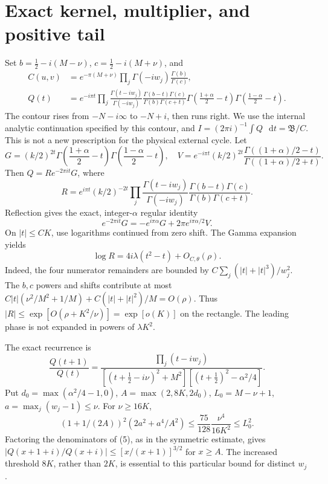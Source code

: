 \documentclass[11pt,a4paper]{article}
\newcommand{\dd}{\mathop{}\!\mathrm d}
\begin{document}
\newpage
\section{Exact kernel, multiplier, and positive tail}
Set \(b=\tfrac12-i(M-\nu)\), \(c=\tfrac12-i(M+\nu)\), and
\begin{align*}
 C(u,v)&=e^{-\pi(M+\nu)}\prod_j\Gamma(-iw_j)\frac{\Gamma(b)}{\Gamma(c)},\\
 Q(t)&=e^{-i\pi t}\prod_j\frac{\Gamma(t-iw_j)}{\Gamma(-iw_j)}
 \frac{\Gamma(b-t)\Gamma(c)}{\Gamma(b)\Gamma(c+t)}
 \Gamma\left(\frac{1+\alpha}2-t\right)
 \Gamma\left(\frac{1-\alpha}2-t\right).
\end{align*}
The contour rises from \(-N-i\infty\) to \(-N+i\), then runs right.
We use the internal analytic continuation specified by this contour,
and \(I=(2\pi i)^{-1}\int Q\,\dd t=\mathfrak B/C\).
This is not a new prescription for the physical external cycle.
Let
\[
 G=(k/2)^{2t}\Gamma\left(\frac{1+\alpha}2-t\right)
                 \Gamma\left(\frac{1-\alpha}2-t\right),\quad
 V=e^{-i\pi t}(k/2)^{2t}
       \frac{\Gamma((1+\alpha)/2-t)}{\Gamma((1+\alpha)/2+t)} .
\]
Then \(Q=Re^{-2\pi it}G\), where
\[
 R=e^{i\pi t}(k/2)^{-2t}\prod_j\frac{\Gamma(t-iw_j)}{\Gamma(-iw_j)}
        \frac{\Gamma(b-t)\Gamma(c)}{\Gamma(b)\Gamma(c+t)} .
\]
Reflection gives the exact, integer-\(\alpha\) regular identity
\[
 e^{-2\pi it}G=-e^{i\pi\alpha}G+2\pi e^{i\pi\alpha/2}V.                 \tag{3}
\]
On \(|t|\le CK\), use logarithms continued from zero shift.
The Gamma expansion \cite{gamma} yields
\[
 \log R=4i\lambda(t^2-t)+O_{C,\theta}(\rho).                         \tag{4}
\]
Indeed, the four numerator remainders are bounded by
\(C\sum_j(|t|+|t|^3)/w_j^2\).
The \(b,c\) powers and shifts contribute at most
\(C|t|(\nu^2/M^2+1/M)+C(|t|+|t|^2)/M=O(\rho)\).
Thus \(|R|\le \exp[O(\rho+K^2/\nu)]=\exp[o(K)]\) on the rectangle.
The leading phase is not expanded in powers of \(\lambda K^2\).

The exact recurrence is
\[
 \frac{Q(t+1)}{Q(t)}
 =\frac{\prod_j(t-iw_j)}
 {[(t+\tfrac12-i\nu)^2+M^2][(t+\tfrac12)^2-\alpha^2/4]} .             \tag{5}
\]
Put \(d_0=\max(\alpha^2/4-1,0)\), \(A=\max(2,8K,2d_0)\),
\(L_0=M-\nu+1\), \(a=\max_j(w_j-1)\le\nu\).
For \(\nu\ge16K\),
\[
 (1+1/(2A))^2(2a^2+a^4/A^2)
 \le\frac{75}{128}\frac{\nu^4}{16K^2}\le L_0^2 .
\]
Factoring the denominators of (5), as in the symmetric estimate,
gives \(|Q(x+1+i)/Q(x+i)|\le[x/(x+1)]^{3/2}\) for \(x\ge A\).
The increased threshold \(8K\), rather than \(2K\), is essential
to this particular bound for distinct \(w_j\).
\end{document}
